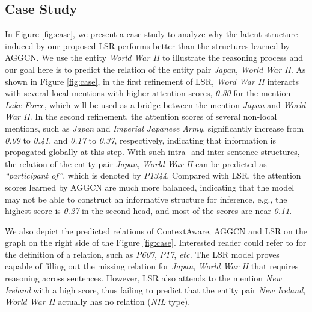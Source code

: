 \documentclass[11pt,a4paper]{article}
\begin{document}
\subsection{Case Study}
In Figure \ref{fig:case}, we present a case study to analyze why the latent structure induced by our proposed LSR performs better than the structures learned by AGGCN. We use the entity \textit{World War II} to illustrate the reasoning process and our goal here is to predict the relation of the entity pair \textit{Japan}, \textit{World War II}. As shown in Figure \ref{fig:case}, in the first refinement of LSR, \textit{Word War II} interacts with several local mentions with higher attention scores,  \textit{0.30} for the mention \textit{Lake Force}, which will be used as a bridge between the mention \textit{Japan} and \textit{World War II}. In the second refinement, the attention scores of several non-local mentions, such as \textit{Japan} and \textit{Imperial Japanese Army}, significantly increase from \textit{0.09} to \textit{0.41}, and \textit{0.17} to \textit{0.37}, respectively, indicating that information is propagated globally at this step. With such intra- and inter-sentence structures, the relation of the entity pair \textit{Japan}, \textit{World War II} can be predicted as
\textit{``participant of''}, which is denoted by \textit{P1344}. Compared with LSR, the attention scores learned by AGGCN are much more balanced, indicating that the model may not be able to construct an informative structure for inference, e.g., the highest score is \textit{0.27} in the second head, and most of the scores are near \textit{0.11}. 

We also depict the predicted relations of ContextAware, AGGCN and LSR on the graph on the right side of the Figure \ref{fig:case}. Interested reader could refer to \cite{yao2019DocRED} for the definition of a relation, such as \textit{P607}, \textit{P17}, \textit{etc.} The LSR model proves capable of filling out the missing relation for \textit{Japan}, \textit{World War II} that requires reasoning across sentences. However, LSR also attends to the mention \textit{New Ireland} with a high score, thus failing to predict that the entity pair \textit{New Ireland}, \textit{World War II} actually has no relation (\textit{NIL} type). 


\iffalse
Table \ref{tbl:case_study} showcases the predictions of the state-of-the-art models and the GloVe-based LSR model for two documents in the development set.
The LSR proves capable of filling out the missing relations that require reasoning across sentences.
In example 1, we see that BERT-based model \cite{wang2019fine} is able to predict that \textit{London}'s sovereign state (country, \textit{P17}) is \textit{UK}, and that \textit{UK} contains administrative territorial entity (\textit{P150}) of \textit{England}, but fails to reason that it also means that \textit{England}'s sovereign state is the \textit{UK}, leading to \textit{London} having \textit{England} as sovereign state as well.
\fi
\end{document}
